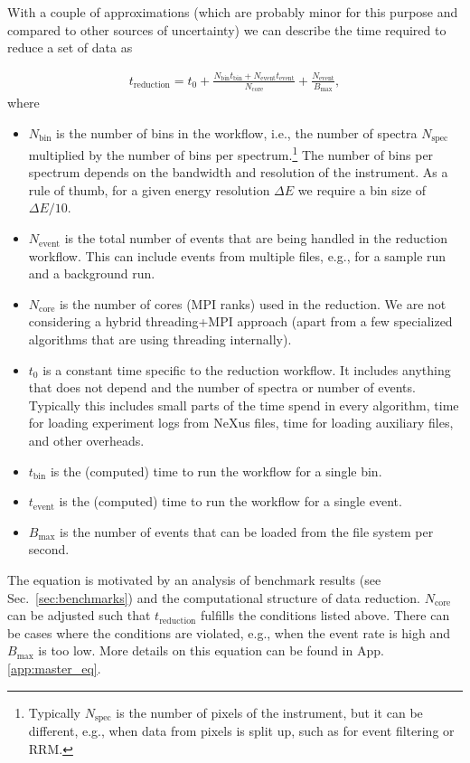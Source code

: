 \documentclass[a4paper,english,numbers=noenddot,bibliography=totoc,chapterprefix=on,DIV=12]{scrartcl}
\newcommand{\Treduction}{t_{\text{reduction}}}
\newcommand{\Tbin}{t_{\text{bin}}}
\newcommand{\Tevent}{t_{\text{event}}}
\newcommand{\Nbin}{N_{\text{bin}}}
\newcommand{\Ncore}{N_{\text{core}}}
\newcommand{\Nevent}{N_{\text{event}}}
\newcommand{\Nspec}{N_{\text{spec}}}
\newcommand{\Bmax}{B_{\text{max}}}
\begin{document}
With a couple of approximations (which are probably minor for this purpose and compared to other sources of uncertainty) we can describe the time required to reduce a set of data as

\begin{align}
  \Treduction = t_0 + \frac{\Nbin\Tbin + \Nevent\Tevent}{\Ncore} + \frac{\Nevent}{\Bmax},
  \label{eq:master}
\end{align}
where
\begin{itemize}
  \item $\Nbin$ is the number of bins in the workflow, i.e., the number of spectra $\Nspec$ multiplied by the number of bins per spectrum.\footnote{Typically $\Nspec$ is the number of pixels of the instrument, but it can be different, e.g., when data from pixels is split up, such as for event filtering or RRM.}
    The number of bins per spectrum depends on the bandwidth and resolution of the instrument.
    As a rule of thumb, for a given energy resolution $\Delta E$ we require a bin size of $\Delta E/10$.
  \item $\Nevent$ is the total number of events that are being handled in the reduction workflow.
    This can include events from multiple files, e.g., for a sample run and a background run.
  \item $\Ncore$ is the number of cores (MPI ranks) used in the reduction.
    We are not considering a hybrid threading+MPI approach (apart from a few specialized algorithms that are using threading internally).
  \item $t_0$ is a constant time specific to the reduction workflow.
    It includes anything that does not depend and the number of spectra or number of events.
    Typically this includes small parts of the time spend in every algorithm, time for loading experiment logs from NeXus files, time for loading auxiliary files, and other overheads.
  \item $\Tbin$ is the (computed) time to run the workflow for a single bin.
  \item $\Tevent$ is the (computed) time to run the workflow for a single event.
  \item $\Bmax$ is the number of events that can be loaded from the file system per second.
\end{itemize}
The equation is motivated by an analysis of benchmark results (see Sec.~\ref{sec:benchmarks}) and the computational structure of data reduction.
$\Ncore$ can be adjusted such that $\Treduction$ fulfills the conditions listed above.
There can be cases where the conditions are violated, e.g., when the event rate is high and $\Bmax$ is too low.
More details on this equation can be found in App. \ref{app:master_eq}.
\end{document}
